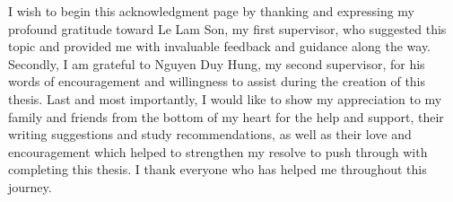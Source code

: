 I wish to begin this acknowledgment page by thanking and expressing my profound gratitude toward Le Lam Son, my first supervisor, who suggested this topic and provided me with invaluable feedback and guidance along the way. Secondly, I am grateful to Nguyen Duy Hung, my second supervisor, for his words of encouragement and willingness to assist during the creation of this thesis. Last and most importantly, I would like to show my appreciation to my family and friends from the bottom of my heart for the help and support, their writing suggestions and study recommendations, as well as their love and encouragement which helped to strengthen my resolve to push through with completing this thesis. I thank everyone who has helped me throughout this journey.